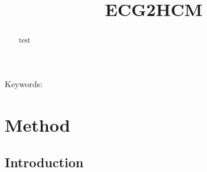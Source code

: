 \documentclass[11pt]{article}
\title{ECG2HCM}
\date{}
\theoremstyle{definition}
\begin{document}
\maketitle


\begin{abstract}
test
\end{abstract}
Keywords: 

\section{Method}
\label{sec:method}


\subsection{Introduction}
\end{document}
